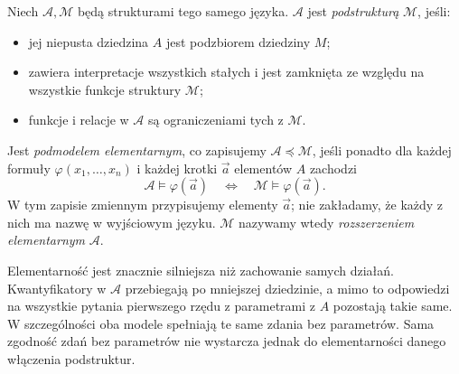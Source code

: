 \begin{definicja}\label{res:14:2}
Niech $\mathcal A,\mathcal M$ będą strukturami tego samego języka. $\mathcal A$ jest \emph{podstrukturą} $\mathcal M$, jeśli:
\begin{itemize}
\item jej niepusta dziedzina $A$ jest podzbiorem dziedziny $M$;
\item zawiera interpretacje wszystkich stałych i jest zamknięta ze względu na wszystkie funkcje struktury $\mathcal M$;
\item funkcje i relacje w $\mathcal A$ są ograniczeniami tych z $\mathcal M$.
\end{itemize}
Jest \emph{podmodelem elementarnym}, co zapisujemy $\mathcal A\preccurlyeq\mathcal M$, jeśli ponadto dla każdej formuły $\varphi(x_1,\ldots,x_n)$ i każdej krotki $\vec a$ elementów $A$ zachodzi
\[
\mathcal A\models\varphi(\vec a)\quad\Longleftrightarrow\quad\mathcal M\models\varphi(\vec a).
\]
W tym zapisie zmiennym przypisujemy elementy $\vec a$; nie zakładamy, że każdy z nich ma nazwę w wyjściowym języku. $\mathcal M$ nazywamy wtedy \emph{rozszerzeniem elementarnym} $\mathcal A$.
\end{definicja}

\begin{uwaga}\label{res:14:3}
Elementarność jest znacznie silniejsza niż zachowanie samych działań. Kwantyfikatory w $\mathcal A$ przebiegają po mniejszej dziedzinie, a mimo to odpowiedzi na wszystkie pytania pierwszego rzędu z parametrami z $A$ pozostają takie same. W szczególności oba modele spełniają te same zdania bez parametrów. Sama zgodność zdań bez parametrów nie wystarcza jednak do elementarności danego włączenia podstruktur.
\end{uwaga}

